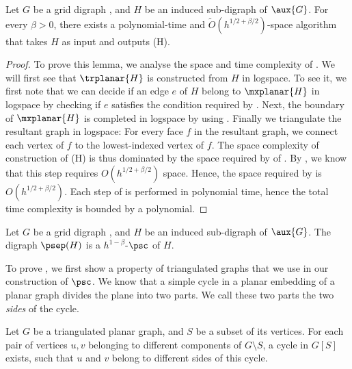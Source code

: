 \documentclass{toc}
\begin{document}
\begin{lemma}\label{lem:psepcomplexity}
Let $G$ be a grid %
digraph %
, and $H$ be %
an%
 induced  %
sub-digraph %
 of $\aux{G}$. For every $\beta > 0$, there exists a polynomial-time %
and $\tilde{O}(h^{1/2 + \beta/2})$-space  %
algorithm that takes $H$ as input and outputs \psep(H).
\end{lemma}
\begin{proof}
  To prove this lemma, we analyse the space and time complexity of 
. We will first see that $\trplanar{H}$ %
is %
 constructed from $H$ in logspace. To see it, we first note that we can decide if an edge $e$ of $H$ belong to $\mxplanar{H}$ in logspace by checking if $e$ satisfies the condition required by . Next, the boundary of $\mxplanar{H}$ %
is %
 completed in logspace by using . Finally we triangulate the resultant graph in logspace: For every face $f$ in the resultant graph, we connect each vertex of $f$ to the lowest-indexed vertex of $f$. The space complexity of construction of \psep(H) is thus dominated by the space required by  of . By , we know that this step requires $O(h^{1/2 + \beta/2})$ space. Hence, the space required by  is $O(h^{1/2 + \beta/2})$. Each step of  %
is %
 performed in polynomial time, hence the total time complexity is bounded by a polynomial.
\end{proof}

\begin{lemma}
\label{lem:psep}
Let $G$ be a grid %
digraph %
, and $H$ be %
an%
induced  %
sub-digraph %
 of $\aux{G}$. The %
digraph %
 $\psep(H)$ is a $h^{1-\beta}$-$\psc$ of $H$.
\end{lemma}
To prove , we first show a property of triangulated graphs that we use in our construction of $\psc$. We know that a simple cycle in a planar embedding of a planar graph divides the plane into two parts. We call these two parts the two \emph{sides} of the cycle.

\begin{lemma}
\label{lem:sepfamily}
Let $G$ be a triangulated planar graph, and $S$ be a subset of its vertices. For each pair of vertices $u, v$ belonging to different components of $G \setminus S$, a cycle in $G[S]$ exists, such that $u$ and $v$ belong to different sides of this cycle.
\end{lemma}
\end{document}
